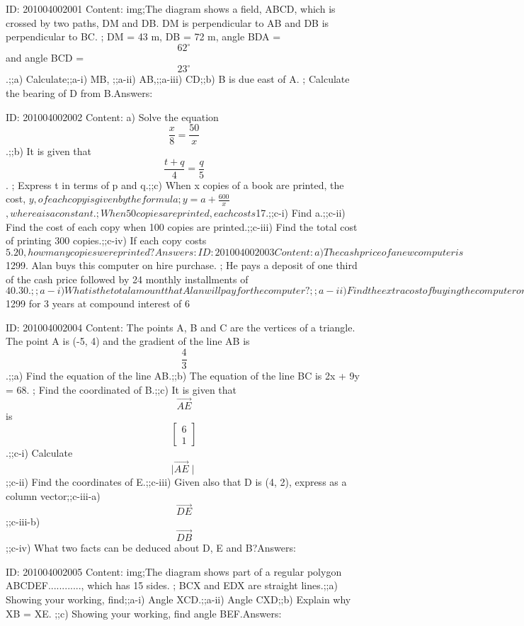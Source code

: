 \documentclass{article}
\begin{document}
ID: 201004002001
Content:
img;The diagram shows a field, ABCD, which is crossed by two paths, DM and DB. DM is perpendicular to AB and DB is perpendicular to BC. ; DM = 43 m, DB = 72 m, angle BDA = $$62^{\circ}$$ and angle BCD = $$23^{\circ}$$.;;a) Calculate;;a-i) MB, ;;a-ii) AB,;;a-iii) CD;;b) B is due east of A. ; Calculate the bearing of D from B.Answers:

ID: 201004002002
Content:
a) Solve the equation $$\frac{x}{8} = \frac{50}{x}$$.;;b) It is given that $$\frac{t + q}{4} = \frac{q}{5}$$. ; Express t in terms of p and q.;;c) When x copies of a book are printed, the cost, $y, of each copy is given by the formula ; $$y = a + \frac{600}{x}$$, where a is a constant. ; When 50 copies are printed, each costs $17.;;c-i) Find a.;;c-ii) Find the cost of each copy when 100 copies are printed.;;c-iii) Find the total cost of printing 300 copies.;;c-iv) If each copy costs $5.20, how many copies were printed?Answers:

ID: 201004002003
Content:
a) The cash price of a new computer is $1299. Alan buys this computer on hire purchase. ; He pays a deposit of one third of the cash price followed by 24 monthly installments of $40.30.;;a-i) What is the total amount that Alan will pay for the computer?;;a-ii) Find the extra cost of buying the computer on hire purchase as a percentage of the cash price.;;b) Betty buys an identical computer. ; To pay for it, she borrows the whole cost of $1299 for 3 years at compound interest of 6%

ID: 201004002004
Content:
The points A, B and C are the vertices of a triangle. The point A is (-5, 4) and the gradient of the line AB is $$\frac{4}{3}$$.;;a) Find the equation of the line AB.;;b) The equation of the line BC is 2x + 9y = 68. ; Find the coordinated of B.;;c) It is given that $$\vec{AE}$$ is $$\begin{bmatrix}6\\1\end{bmatrix}$$.;;c-i) Calculate $$\mid\vec{AE}\mid$$;;c-ii) Find the coordinates of E.;;c-iii) Given also that D is (4, 2), express as a column vector;;c-iii-a) $$\vec{DE}$$;;c-iii-b) $$\vec{DB}$$;;c-iv) What two facts can be deduced about D, E and B?Answers:

ID: 201004002005
Content:
img;The diagram shows part of a regular polygon ABCDEF............, which has 15 sides. ; BCX and EDX are straight lines.;;a) Showing your working, find;;a-i) Angle XCD.;;a-ii) Angle CXD;;b) Explain why XB = XE. ;;c) Showing your working, find angle BEF.Answers:
\end{document}
